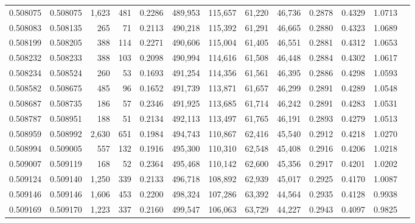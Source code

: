 \begin{tabular}{rrrrrrrrrrrrr}
0.508075 & 0.508075 & 1,623 &   481 &                                     0.2286 & 489,953 & 115,657 &  61,220 &  46,736 & 0.2878 & 0.4329 & 1.0713 \\
0.508083 & 0.508135 &   265 &    71 &                                     0.2113 & 490,218 & 115,392 &  61,291 &  46,665 & 0.2880 & 0.4323 & 1.0689 \\
0.508199 & 0.508205 &   388 &   114 &                                     0.2271 & 490,606 & 115,004 &  61,405 &  46,551 & 0.2881 & 0.4312 & 1.0653 \\
0.508232 & 0.508233 &   388 &   103 &                                     0.2098 & 490,994 & 114,616 &  61,508 &  46,448 & 0.2884 & 0.4302 & 1.0617 \\
0.508234 & 0.508524 &   260 &    53 &                                     0.1693 & 491,254 & 114,356 &  61,561 &  46,395 & 0.2886 & 0.4298 & 1.0593 \\
0.508582 & 0.508675 &   485 &    96 &                                     0.1652 & 491,739 & 113,871 &  61,657 &  46,299 & 0.2891 & 0.4289 & 1.0548 \\
0.508687 & 0.508735 &   186 &    57 &                                     0.2346 & 491,925 & 113,685 &  61,714 &  46,242 & 0.2891 & 0.4283 & 1.0531 \\
0.508787 & 0.508951 &   188 &    51 &                                     0.2134 & 492,113 & 113,497 &  61,765 &  46,191 & 0.2893 & 0.4279 & 1.0513 \\
0.508959 & 0.508992 & 2,630 &   651 &                                     0.1984 & 494,743 & 110,867 &  62,416 &  45,540 & 0.2912 & 0.4218 & 1.0270 \\
0.508994 & 0.509005 &   557 &   132 &                                     0.1916 & 495,300 & 110,310 &  62,548 &  45,408 & 0.2916 & 0.4206 & 1.0218 \\
0.509007 & 0.509119 &   168 &    52 &                                     0.2364 & 495,468 & 110,142 &  62,600 &  45,356 & 0.2917 & 0.4201 & 1.0202 \\
0.509124 & 0.509140 & 1,250 &   339 &                                     0.2133 & 496,718 & 108,892 &  62,939 &  45,017 & 0.2925 & 0.4170 & 1.0087 \\
0.509146 & 0.509146 & 1,606 &   453 &                                     0.2200 & 498,324 & 107,286 &  63,392 &  44,564 & 0.2935 & 0.4128 & 0.9938 \\
0.509169 & 0.509170 & 1,223 &   337 &                                     0.2160 & 499,547 & 106,063 &  63,729 &  44,227 & 0.2943 & 0.4097 & 0.9825 \\

\end{tabular}
